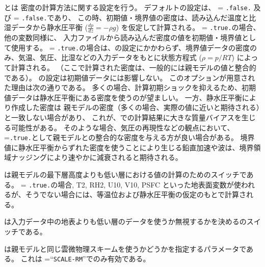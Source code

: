 とは
密度の計算方法に関する設定を行う。
デフォルトの設定は、
 = \verb|.false.| 及び 
 = \verb|.false.|であり、
この時、初期値・境界値の密度は、読み込んだ温度と比湿データから静水圧平衡 ($\frac{dp}{dz}=-\rho g$) を仮定して計算される。
 = \verb|.true.|の場合、他の変数同様に、
入力ファイルから読み込んだ密度の値を初期値・境界値として使用する。
 = \verb|.true.|の場合は、の設定にかかわらず、境界値データの密度のみ、気温、気圧、比湿などの入力データをもとに状態方程式 ($\rho = p/RT$) によって計算される。
（ここで計算された密度は、一般的には親モデルの値と整合的である）。
 の設定は初期値データには影響しない。
このオプションが用意された理由は次の通りである。
多くの場合、計算初期ショックを抑えるため、初期値データは静水圧平衡にある密度を使うのが望ましい。
一方、静水圧平衡により作成した密度は
親モデルの密度（多くの場合、実際の値に近いと期待される）と一致しない場合があり、
これが、\scalerm での計算結果に大きな質量バイアスを生じる可能性がある。
そのような場合、気圧の再現性などの観点において、
=\verb|.true.|として親モデルとの整合的な密度を与える方が良い場合がある。
境界値に静水圧平衡からずれた密度を使うことにより生じる鉛直加速や波は、境界領域ナッジングにより速やかに減衰されると期待される。


は親モデルの最下層高度よりも低い層における値の計算のためのスイッチである。
 = \verb|.true.|の場合, T2, RH2, U10, V10, PSFC といった地表面変数が使われるが、そうでない場合には、等温位および静水圧平衡の仮定のもとで計算される。

は入力データ中の地表よりも低い層のデータを使うか無視するかを決めるのスイッチである。


は親モデルと同じ雲微物理スキームを使うかどうかを指定するパラメータである。
これは =``\verb|SCALE-RM|''でのみ有効である。




